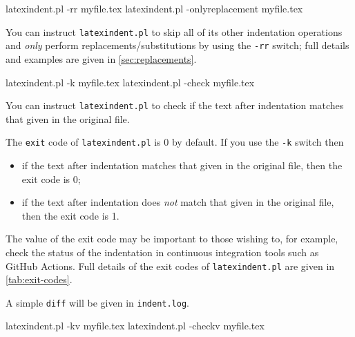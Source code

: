 
 \begin{commandshell}
latexindent.pl -rr myfile.tex
latexindent.pl -onlyreplacement myfile.tex
\end{commandshell}

 You can  instruct
 \texttt{latexindent.pl} to skip all of its other indentation operations and \emph{only}
 perform replacements/substitutions by using the \texttt{-rr} switch; full details and
 examples are given in \vref{sec:replacements}.%


 \begin{commandshell}
latexindent.pl -k myfile.tex
latexindent.pl -check myfile.tex
\end{commandshell}

 You can  instruct \texttt{latexindent.pl} to
 check if the text after indentation matches that given in the original file.%

 The \texttt{exit} code  of \texttt{latexindent.pl} is 0 by default. If
 you use the \texttt{-k} switch then
 \begin{itemize}
  \item if the text after indentation matches that given in the original file, then the
        exit code is 0;
  \item if the text after indentation does \emph{not} match that given in the original
        file, then the exit code is 1.
 \end{itemize}

 The value of the exit code may be important to those wishing to, for example, check the
 status of the indentation in continuous integration tools such as GitHub Actions. Full
 details of the exit codes of \texttt{latexindent.pl} are given in \cref{tab:exit-codes}.

 A simple \texttt{diff} will be given in \texttt{indent.log}.


 \begin{commandshell}
latexindent.pl -kv myfile.tex
latexindent.pl -checkv myfile.tex
\end{commandshell}

